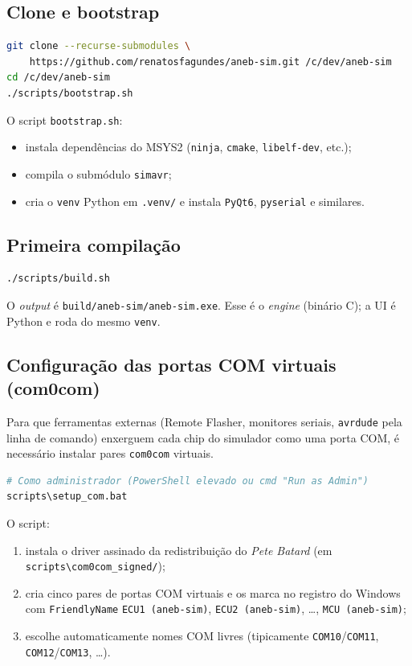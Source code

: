 \documentclass[12pt,a4paper]{article}
\begin{document}
\subsection{Clone e bootstrap}

\begin{lstlisting}[language=bash]
git clone --recurse-submodules \
    https://github.com/renatosfagundes/aneb-sim.git /c/dev/aneb-sim
cd /c/dev/aneb-sim
./scripts/bootstrap.sh
\end{lstlisting}

O script \texttt{bootstrap.sh}:

\begin{itemize}[nosep]
  \item instala dependências do MSYS2 (\texttt{ninja},
        \texttt{cmake}, \texttt{libelf-dev}, etc.);
  \item compila o submódulo \texttt{simavr};
  \item cria o \texttt{venv} Python em \texttt{.venv/} e instala
        \texttt{PyQt6}, \texttt{pyserial} e similares.
\end{itemize}

\subsection{Primeira compilação}

\begin{lstlisting}[language=bash]
./scripts/build.sh
\end{lstlisting}

O \emph{output} é \texttt{build/aneb-sim/aneb-sim.exe}. Esse é o
\emph{engine} (binário C); a UI é Python e roda do mesmo
\texttt{venv}.

\subsection{Configuração das portas COM virtuais (com0com)}

Para que ferramentas externas (Remote Flasher, monitores seriais,
\texttt{avrdude} pela linha de comando) enxerguem cada chip do
simulador como uma porta COM, é necessário instalar pares
\texttt{com0com} virtuais.

\begin{lstlisting}[language=bash]
# Como administrador (PowerShell elevado ou cmd "Run as Admin")
scripts\setup_com.bat
\end{lstlisting}

O script:

\begin{enumerate}[nosep]
  \item instala o driver assinado da redistribuição do
        \emph{Pete Batard} (em \texttt{scripts\textbackslash com0com\_signed/});
  \item cria cinco pares de portas COM virtuais e os marca no
        registro do Windows com \texttt{FriendlyName}
        \texttt{ECU1 (aneb-sim)}, \texttt{ECU2 (aneb-sim)}, …,
        \texttt{MCU (aneb-sim)};
  \item escolhe automaticamente nomes COM livres
        (tipicamente \texttt{COM10}/\texttt{COM11},
        \texttt{COM12}/\texttt{COM13}, …).
\end{enumerate}
\end{document}
